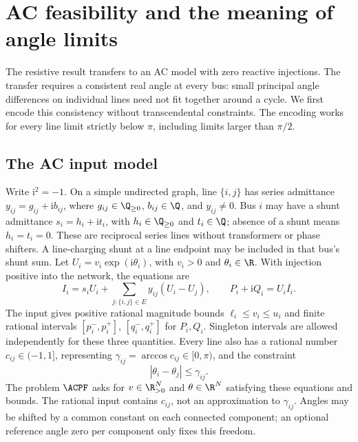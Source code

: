 \section{AC feasibility and the meaning of angle limits}
\label{sec:ac}

The resistive result transfers to an AC model with zero reactive injections.
The transfer requires a consistent real angle at every bus: small principal
angle differences on individual lines need not fit together around a cycle.
We first encode this consistency without transcendental constraints. The
encoding works for every line limit strictly below $\pi$, including limits
larger than $\pi/2$.

\subsection{The AC input model}

Write $\mathrm{i}^2=-1$. On a simple undirected graph, line $\{i,j\}$ has
series admittance $y_{ij}=g_{ij}+\mathrm{i}b_{ij}$, where
$g_{ij}\in\Q_{\ge0}$, $b_{ij}\in\Q$, and $y_{ij}\ne0$. Bus $i$ may have a
shunt admittance $s_i=h_i+\mathrm{i}t_i$, with $h_i\in\Q_{\ge0}$ and
$t_i\in\Q$; absence of a shunt means $h_i=t_i=0$. These are reciprocal
series lines without transformers or phase shifters. A line-charging shunt
at a line endpoint may be included in that bus's shunt sum.
Let $U_i=v_i\exp(\mathrm{i}\theta_i)$, with $v_i>0$ and
$\theta_i\in\R$. With injection positive into the network, the equations are
\begin{equation}
 I_i=s_iU_i+\sum_{j:\{i,j\}\in E}y_{ij}(U_i-U_j),\qquad
 P_i+\mathrm{i}Q_i=U_i\overline{I_i}.
 \label{eq:complex-power}
\end{equation}
The input gives positive rational magnitude bounds $\ell_i\le v_i\le u_i$
and finite rational intervals $[p_i^-,p_i^+]$, $[q_i^-,q_i^+]$ for $P_i,Q_i$.
Singleton intervals are allowed independently for these three quantities.
Every line also has a rational number $c_{ij}\in(-1,1]$, representing
$\gamma_{ij}=\arccos c_{ij}\in[0,\pi)$, and the constraint
\begin{equation}
 |\theta_i-\theta_j|\le\gamma_{ij}.
 \label{eq:real-angle-limit}
\end{equation}
The problem $\ACPF$ asks for $v\in\R_{>0}^N$ and $\theta\in\R^N$ satisfying
these equations and bounds. The rational input contains $c_{ij}$, not an
approximation to $\gamma_{ij}$. Angles may be shifted by a common constant
on each connected component; an optional reference angle zero per component
only fixes this freedom.

